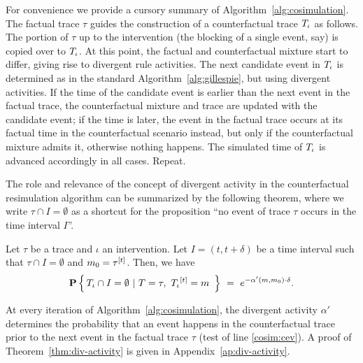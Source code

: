 For convenience we provide a cursory summary of
Algorithm~\ref{alg:cosimulation}. The factual trace $\tau$ guides the
construction of a counterfactual trace ${T_\iota}{}$ as follows. The
portion of $\tau$ up to the intervention (the blocking of a single
event, say) is copied over to ${T_\iota}{}$. At this point, the factual
and counterfactual mixture start to differ, giving rise to divergent
rule activities. The next candidate event in ${T_\iota}{}$ is determined
as in the standard Algorithm~\ref{alg:gillespie}, but using divergent
activities. If the time of the candidate event is earlier than the
next event in the factual trace, the counterfactual mixture and trace
are updated with the candidate event; if the time is later, the event
in the factual trace occurs at its factual time in the counterfactual
scenario instead, but only if the counterfactual mixture admits it,
otherwise nothing happens. The simulated time of ${T_\iota}{}$ is
advanced accordingly in all cases. Repeat.

The role and relevance of the concept of divergent activity in the
counterfactual resimulation algorithm can be summarized by the
following theorem, where we write $\tau \cap I = \emptyset$ as a
shortcut for the proposition ``no event of trace $\tau$ occurs in the
time interval $I$''.
\begin{theorem}\label{thm:div-activity}
  Let $\tau$ be a trace and $\iota$ an intervention. Let
  $I = (t, t+\delta)$ be a time interval such that
  $\tau \cap I = \emptyset$ and $m_0 =\tau^{[t]}$. Then, we have
  \[\mathbf{P} \left\{\,  {T_\iota}{} \cap I = \emptyset  \ |\  T=\tau,\
      {T_\iota}{}^{[t]} = m\  \,\right\}
    \ =\ e^{-\alpha'(m, m_0) \cdot \delta}.
  \]
\end{theorem}
\noindent At every iteration of Algorithm~\ref{alg:cosimulation}, the
divergent activity $\alpha'$ determines the probability that an event
happens in the counterfactual trace prior to the next event in the
factual trace $\tau$ (test of line \ref{cosim:cev}).  A proof of
Theorem~\ref{thm:div-activity} is given in
Appendix~\ref{ap:div-activity}.

